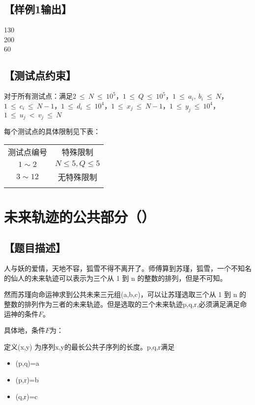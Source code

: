 \documentclass{statement}
\begin{document}
    \subsection[样例1输出]{【样例1输出】}
    \begin{example}
130\\
200\\
60
    \end{example}

    \subsection[测试点约束]{【测试点约束】}
    对于所有测试点：满足$ 2\ \leq\ N\ \leq\ 10^5 $，$ 1\ \leq\ Q\ \leq\ 10^5 $，$ 1\ \leq\ a_i,\ b_i\ \leq\ N $，$ 1\ \leq\ c_i\ \leq\ N-1 $，$ 1\ \leq\ d_i\ \leq\ 10^4 $，$ 1\ \leq\ x_j\ \leq\ N-1 $，$ 1\ \leq\ y_j\ \leq\ 10^4 $，$ 1\ \leq\ u_j\ <\ v_j\ \leq\ N $

    每个测试点的具体限制见下表：
    \begin{center}
        \begin{tabular}{|c|c|}
            \Xhline{5\arrayrulewidth}
            测试点编号 & 特殊限制\\
            \Xhline{3\arrayrulewidth}
            $1\sim 2$  & $N \le 5,Q\le 5$\\
            \hline
            $3 \sim 12$ & 无特殊限制\\
            \Xhline{5\arrayrulewidth}
        \end{tabular}
    \end{center}
    \newpage
    \section{未来轨迹的公共部分（）}
	\subsection[题目描述]{【题目描述】}
	人与妖的爱情，天地不容，狐雪不得不离开了。师傅算到苏瑾，狐雪，一个不知名的仙人的未来轨迹可以表示为三个从 1 到 n 的整数的排列，但是不可知。
	
	然而苏瑾向命运神求到公共未来三元组(a,b,c)，可以让苏瑾选取三个从 1 到 n 的整数的排列作为三者的未来轨迹。但是选取的三个未来轨迹p,q,r,必须满足满足命运神的条件$F$。
	
	具体地，条件$F$为：
	
	定义(x,y) 为序列x,y的最长公共子序列的长度。p,q,r满足
	\begin{itemize}
		\item {}(p,q)=a
		
		\item {}(p,r)=b
		
		\item {}(q,r)=c
	\end{itemize}
	
\end{document}
